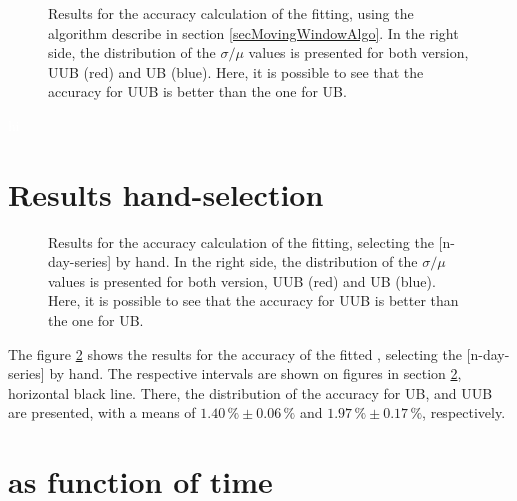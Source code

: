 \documentclass[twoside, final, 10pt]{articleMine}
\begin{document}
\begin{figure}[!t]
  \centering
  \caption{Results for the accuracy calculation of the \qpkvem
  fitting, using the algorithm describe in section 
  \ref{secMovingWindowAlgo}. In the right side, the distribution
  of the $\sigma/\mu$ values is presented for both version, UUB
  (red) and UB (blue). Here, it is possible to see that the
  accuracy for UUB is better than the one for UB.}
  \label{figAccuracyResults}
\end{figure}
\textcolor{white}{hi}
\clearpage


\section{Results hand-selection}
\begin{figure}[!t]
  \centering
  \caption{Results for the accuracy calculation of the \qpkvem
  fitting, selecting the [n-day-series] by hand. In the right
  side, the distribution of the $\sigma/\mu$ values is presented
  for both version, UUB (red) and UB (blue). Here, it is possible
  to see that the accuracy for UUB is better than the one for
  UB.}
  \label{figAccuracyResultsHand}
\end{figure}

The figure \ref{figAccuracyResultsHand} shows the results for the
accuracy of the fitted \qpkvem, selecting the [n-day-series] by
hand. The respective intervals are shown on figures in section
\ref{secQpkVsTime}, horizontal black line. There, the
distribution of the accuracy for UB, and UUB are presented, with
a means of $1.40\,\%\pm0.06\,\%$ and $1.97\,\%\pm0.17\,\%$,
respectively.
\clearpage




\section{\qpkvem as function of time}
\label{secQpkVsTime}
\end{document}
